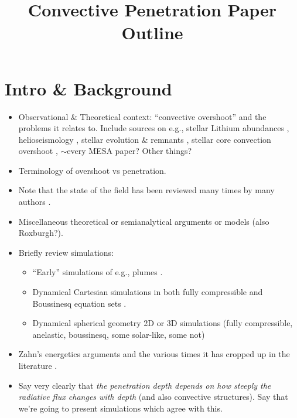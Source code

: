 \documentclass[12pt]{article}
\begin{document}
\title{Convective Penetration Paper Outline}
\maketitle

\section{Intro \& Background}
\begin{itemize}
\item Observational \& Theoretical context: ``convective overshoot'' and the problems it relates to.
Include sources on e.g., stellar Lithium abundances \citep[][fig 4]{pinsonneault_1997}, helioseismology \citep[][]{christensen-dalsgaard_etal_2011}, stellar evolution \& remnants \citep{higgins_vink_2020}, stellar core convection overshoot \citep{claret_torres_2018}, $\sim$every MESA paper? Other things?
\item Terminology of overshoot vs penetration.
\item Note that the state of the field has been reviewed many times by many authors \citep{marcus_etal_1983, zahn1991, browning_etal_2004, rogers_etal_2006, viallet_etal_2015, korre_etal_2019}.
\item Miscellaneous theoretical or semianalytical arguments or models \citep{marcus_etal_1983, zahn1991, hurlburt_etal_1994, rempel2004, canuto2011, viallet_etal_2015, korre_etal_2019} (also Roxburgh?).
\item Briefly review simulations:
\begin{itemize}
\item ``Early'' simulations of e.g., plumes \citep{schmitt_etal_1984}.
\item Dynamical Cartesian simulations in both fully compressible and Boussinesq equation sets \citep{hurlburt_etal_1994, brummell_etal_2002, rogers_glatzmaier_2005, kapyla_etal_2007, kitiashvili_etal_2016, kapyla_etal_2017, couston_etal_2017, toppaladoddi_wettlaufer_2018}.
\item Dynamical spherical geometry 2D or 3D simulations (fully compressible, anelastic, boussinesq, some solar-like, some not) \citep{browning_etal_2004, rogers_etal_2006, brun_etal_2017, pratt_etal_2017, dietrich_wicht_2018}
\end{itemize}
\item Zahn's energetics arguments and the various times it has cropped up in the literature \citep{zahn1991, hurlburt_etal_1994, rempel2004, rogers_etal_2006}.
\item Say very clearly that \emph{the penetration depth depends on how steeply the radiative flux changes with depth} (and also convective structures).
Say that we're going to present simulations which agree with this.
\end{itemize}
\end{document}
